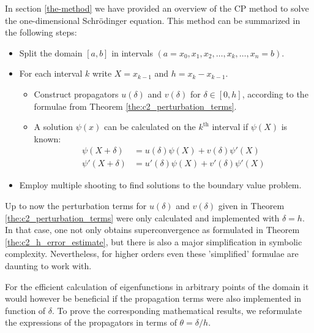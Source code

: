 In section \ref{the-method} we have provided an overview of the CP method to solve the one-dimensional Schrödinger equation. This method can be summarized in the following steps:
\begin{itemize}
    \item Split the domain $[a, b]$ in intervals $(a=x_0, x_1, x_2, \dots, x_k, \dots, x_n = b)$.
    \item For each interval $k$ write $X = x_{k-1}$ and $h = x_k - x_{k-1}$. \begin{itemize}
              \item Construct propagators $u(\delta)$ and $v(\delta)$ for $\delta \in [0, h]$, according to the formulae from Theorem \ref{the:c2_perturbation_terms}.
              \item A solution $\psi(x)$ can be calculated on the $k^\text{th}$ interval if $\psi(X)$ is known:
                    \begin{align*}
                        \psi(X+\delta)  & = u(\delta)\psi(X) + v(\delta)\psi'(X)   \\
                        \psi'(X+\delta) & = u'(\delta)\psi(X) + v'(\delta)\psi'(X)
                    \end{align*}
          \end{itemize}
    \item Employ multiple shooting to find solutions to the boundary value problem.
\end{itemize}

Up to now the perturbation terms for $u(\delta)$ and $v(\delta)$ given in Theorem \ref{the:c2_perturbation_terms} were only calculated and implemented with $\delta = h$. In that case, one not only obtains superconvergence as formulated in Theorem \ref{the:c2_h_error_estimate}, but there is also a major simplification in symbolic complexity. Nevertheless, for higher orders even these 'simplified' formulae are daunting to work with.

For the efficient calculation of eigenfunctions in arbitrary points of the domain it would however be beneficial if the propagation terms were also implemented in function of $\delta$. To prove the corresponding mathematical results, we reformulate the expressions of the propagators in terms of $\theta=\delta/h$.

%
%

